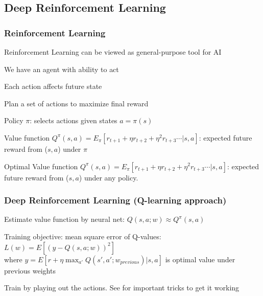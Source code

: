 \subsection[Deep Reinforcement]{Deep Reinforcement Learning}

\begin{frame}
\frametitle{Reinforcement Learning}
\bi
\item Reinforcement Learning can be viewed as general-purpose tool for AI
\bi
	\item We have an {\color{red} agent} with ability to {\color{red} act}
	\item Each {\color{red} action} affects future {\color{red} state}
	\item Plan a set of actions to maximize final {\color{red} reward}
\ei
\pause
\item Policy $\pi$: selects actions given states $a=\pi(s)$
\item Value function $Q^\pi(s,a) = E_\pi[r_{t+1}+\eta r_{t+2} + \eta^2 r_{t+3} \cdots | s,a]$: expected future reward from ($s,a$) under $\pi$ 
\item Optimal Value function $Q^\pi(s,a) = E_\pi[r_{t+1}+\eta r_{t+2} + \eta^2 r_{t+3} \cdots | s,a]$: expected future reward from ($s,a$) under any policy.
\ei
\end{frame}

\begin{frame}
\frametitle{Deep Reinforcement Learning (Q-learning approach)}
\bi 
\item Estimate value function by neural net: $Q(s,a;w) \approx Q^\pi(s,a)$
\item Training objective: mean square error of Q-values: 
\begin{math}
L(w)=E[\left(y - Q(s,a;w)\right)^2]
\end{math}\\[0.2cm]
where $y= E[r+\eta \max_{a'} Q(s',a'; w_{previous}) | s,a] $ is optimal value under previous weights
\item Train by playing out the actions. See \cite{mnih13atari} for important tricks to get it working
\ei
\end{frame}

